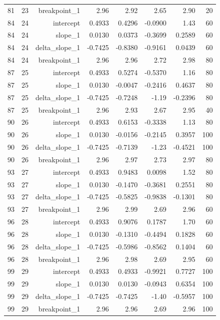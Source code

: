 {\begin{longtable}{lrrrrrrr}
  81 & 23 & breakpoint\_1 & 2.96 & 2.92 & 2.65 & 2.90 & 20 \\
  84 & 24 & intercept & 0.4933 & 0.4296 & -0.0900 & 1.43 & 60 \\
  84 & 24 & slope\_1 & 0.0130 & 0.0373 & -0.3699 & 0.2589 & 60 \\
  84 & 24 & delta\_slope\_1 & -0.7425 & -0.8380 & -0.9161 & 0.0439 & 60 \\
  84 & 24 & breakpoint\_1 & 2.96 & 2.96 & 2.72 & 2.98 & 80 \\
  87 & 25 & intercept & 0.4933 & 0.5274 & -0.5370 & 1.16 & 80 \\
  87 & 25 & slope\_1 & 0.0130 & -0.0047 & -0.2416 & 0.4637 & 80 \\
  87 & 25 & delta\_slope\_1 & -0.7425 & -0.7248 & -1.19 & -0.2396 & 80 \\
  87 & 25 & breakpoint\_1 & 2.96 & 2.93 & 2.67 & 2.95 & 40 \\
  90 & 26 & intercept & 0.4933 & 0.6153 & -0.3338 & 1.13 & 80 \\
  90 & 26 & slope\_1 & 0.0130 & -0.0156 & -0.2145 & 0.3957 & 100 \\
  90 & 26 & delta\_slope\_1 & -0.7425 & -0.7139 & -1.23 & -0.4521 & 100 \\
  90 & 26 & breakpoint\_1 & 2.96 & 2.97 & 2.73 & 2.97 & 80 \\
  93 & 27 & intercept & 0.4933 & 0.9483 & 0.0098 & 1.52 & 80 \\
  93 & 27 & slope\_1 & 0.0130 & -0.1470 & -0.3681 & 0.2551 & 80 \\
  93 & 27 & delta\_slope\_1 & -0.7425 & -0.5825 & -0.9838 & -0.1301 & 80 \\
  93 & 27 & breakpoint\_1 & 2.96 & 2.99 & 2.69 & 2.96 & 60 \\
  96 & 28 & intercept & 0.4933 & 0.9076 & 0.1787 & 1.70 & 60 \\
  96 & 28 & slope\_1 & 0.0130 & -0.1310 & -0.4494 & 0.1828 & 60 \\
  96 & 28 & delta\_slope\_1 & -0.7425 & -0.5986 & -0.8562 & 0.1404 & 60 \\
  96 & 28 & breakpoint\_1 & 2.96 & 2.98 & 2.69 & 2.95 & 60 \\
  99 & 29 & intercept & 0.4933 & 0.4933 & -0.9921 & 0.7727 & 100 \\
  99 & 29 & slope\_1 & 0.0130 & 0.0130 & -0.0943 & 0.6354 & 100 \\
  99 & 29 & delta\_slope\_1 & -0.7425 & -0.7425 & -1.40 & -0.5957 & 100 \\
  99 & 29 & breakpoint\_1 & 2.96 & 2.96 & 2.69 & 2.96 & 100 \\
\end{longtable}
}
